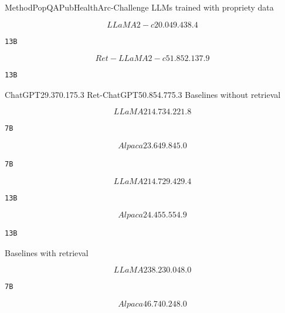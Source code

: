 \documentclass[12pt,a4paper,openright,UTF8]{ctexbook}
\begin{document}
MethodPopQAPubHealthArc-Challenge LLMs trained with propriety data

\begin{equation*}
LLaMA2-c20.049.438.4
\end{equation*}

\begin{lstlisting}
13B
\end{lstlisting}

\begin{equation*}
Ret-LLaMA2-c51.852.137.9
\end{equation*}

\begin{lstlisting}
13B
\end{lstlisting}
ChatGPT29.370.175.3 Ret-ChatGPT50.854.775.3 Baselines without retrieval

\begin{equation*}
LLaMA214.734.221.8
\end{equation*}

\begin{lstlisting}
7B
\end{lstlisting}

\begin{equation*}
Alpaca23.649.845.0
\end{equation*}

\begin{lstlisting}
7B
\end{lstlisting}

\begin{equation*}
LLaMA214.729.429.4
\end{equation*}

\begin{lstlisting}
13B
\end{lstlisting}

\begin{equation*}
Alpaca24.455.554.9
\end{equation*}

\begin{lstlisting}
13B
\end{lstlisting}
Baselines with retrieval

\begin{equation*}
LLaMA238.230.048.0
\end{equation*}

\begin{lstlisting}
7B
\end{lstlisting}

\begin{equation*}
Alpaca46.740.248.0
\end{equation*}
\end{document}
